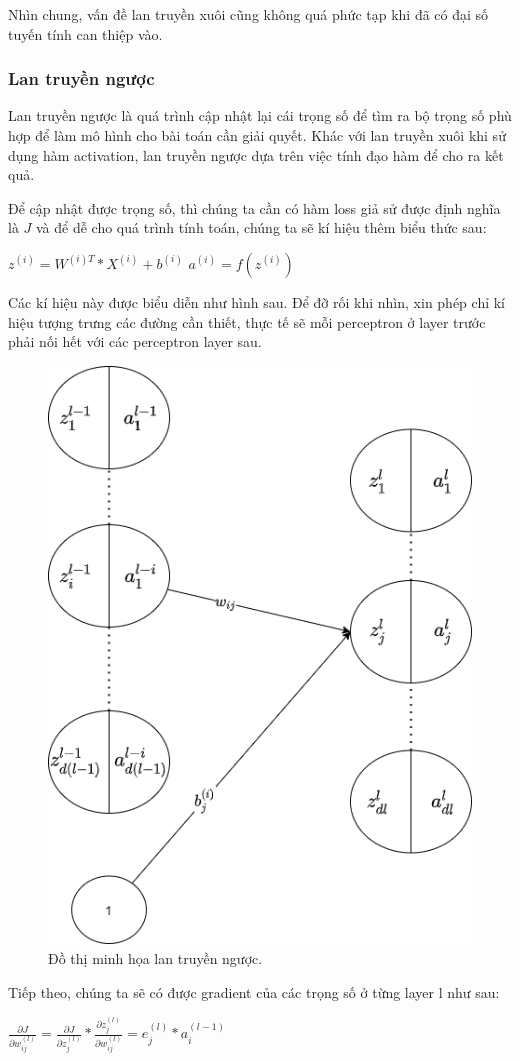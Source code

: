 Nhìn chung, vấn đề lan truyền xuôi cũng không quá phức tạp khi đã có đại số tuyến tính can thiệp vào.

\subsubsection{Lan truyền ngược}
Lan truyền ngược là quá trình cập nhật lại cái trọng số để tìm ra bộ trọng số phù hợp để làm mô hình cho bài toán cần giải quyết. Khác với lan truyền xuôi khi sử dụng hàm activation, lan truyền ngược dựa trên việc tính đạo hàm để cho ra kết quả.

Để cập nhật được trọng số, thì chúng ta cần có hàm loss giả sử được định nghĩa là $J$ và để dễ cho quá trình tính toán, chúng ta sẽ kí hiệu thêm biểu thức sau:
\begin{center}
    $z^{(i)}=W^{(i)T}*X^{(i)}+b^{(i)}$
    $a^{(i)} = f(z^{(i)})$
\end{center}

Các kí hiệu này được biểu diễn như hình sau. Để đỡ rối khi nhìn, xin phép chỉ kí hiệu tượng trưng các đường cần thiết, thực tế sẽ mỗi perceptron ở layer trước phải nối hết với các perceptron layer sau.
\begin{figure}[!h]
	\centering
		\includegraphics[width=0.5\columnwidth]{chapter03/figure/ltn.png}
        \caption{Đồ thị minh họa lan truyền ngược.}
        \label{fig:ltn}
		\centering
\end{figure}

Tiếp theo, chúng ta sẽ có được gradient của các trọng số ở từng layer l như sau:
\begin{center}
        $\frac{\partial J}{\partial w^{(l)}_{ij}} = \frac{\partial J}{\partial z_{j}^{(l)}} * \frac{\partial z_{j}^{(l)}}{\partial w^{(l)}_{ij}}=e^{(l)}_{j} * a_{i}^{(l-1)}$\\
\end{center}

